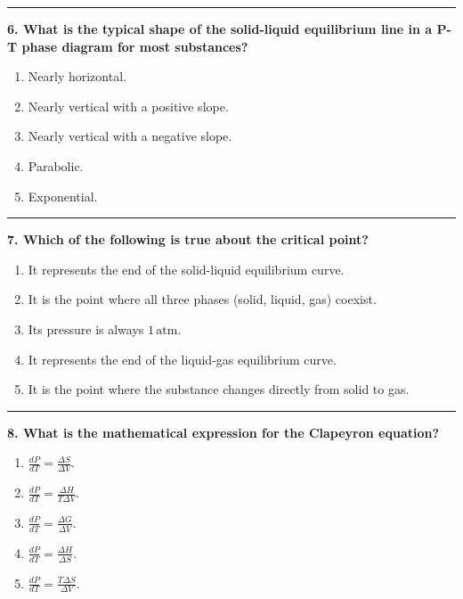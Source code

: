 \documentclass[
  9pt,
]{extbook}
\providecommand{\tightlist}{%
  \setlength{\itemsep}{0pt}\setlength{\parskip}{0pt}}
\theoremstyle{definition}
\theoremstyle{definition}
\theoremstyle{definition}
\theoremstyle{remark}
\begin{document}
\begin{center}\rule{0.5\linewidth}{0.5pt}\end{center}

\textbf{6. What is the typical shape of the solid-liquid equilibrium line in a P-T phase diagram for most substances?}

\begin{enumerate}
\def\labelenumi{\alph{enumi}.}
\tightlist
\item
  Nearly horizontal.
\item
  Nearly vertical with a positive slope.
\item
  Nearly vertical with a negative slope.
\item
  Parabolic.
\item
  Exponential.
\end{enumerate}

\begin{center}\rule{0.5\linewidth}{0.5pt}\end{center}

\textbf{7. Which of the following is true about the critical point?}

\begin{enumerate}
\def\labelenumi{\alph{enumi}.}
\tightlist
\item
  It represents the end of the solid-liquid equilibrium curve.
\item
  It is the point where all three phases (solid, liquid, gas) coexist.
\item
  Its pressure is always \(1\,\text{atm}\).
\item
  It represents the end of the liquid-gas equilibrium curve.
\item
  It is the point where the substance changes directly from solid to gas.
\end{enumerate}

\begin{center}\rule{0.5\linewidth}{0.5pt}\end{center}

\textbf{8. What is the mathematical expression for the Clapeyron equation?}

\begin{enumerate}
\def\labelenumi{\alph{enumi}.}
\tightlist
\item
  \(\frac{dP}{dT} = \frac{\Delta S}{\Delta V}\).
\item
  \(\frac{dP}{dT} = \frac{\Delta H}{T\Delta V}\).
\item
  \(\frac{dP}{dT} = \frac{\Delta G}{\Delta V}\).
\item
  \(\frac{dP}{dT} = \frac{\Delta H}{\Delta S}\).
\item
  \(\frac{dP}{dT} = \frac{T\Delta S}{\Delta V}\).
\end{enumerate}
\end{document}
